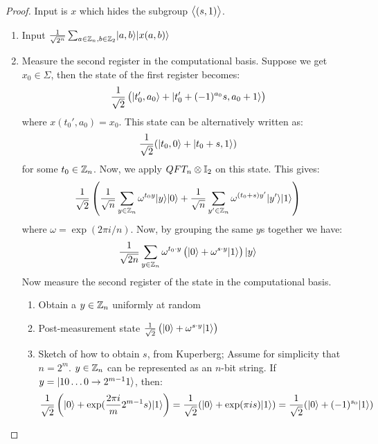 \begin{proof}
    Input is $x$ which hides the subgroup $\left< (s, 1) \right>$.
    \begin{enumerate}
        \item Input $\frac{1}{\sqrt{2^n}}\sum_{a \in \mathbb{Z}_n, b \in \mathbb{Z}_2}\lvert a, b \rangle\lvert x(a, b) \rangle$
        \item Measure the second register in the computational basis. Suppose we get $x_0 \in \Sigma$, then the state of the first register becomes:
        \begin{equation}
            \frac{1}{\sqrt{2}}\left(\lvert t_0', a_0 \rangle + \lvert t_0' + (-1)^{a_0}s, a_0 + 1 \rangle\right)
        \end{equation}
        where $x(t_0', a_0) = x_0$. This state can be alternatively written as:
        \begin{equation}
            \frac{1}{\sqrt{2}}(\lvert t_0, 0 \rangle + \lvert t_0 + s, 1 \rangle)
        \end{equation}
        for some $t_0 \in \mathbb{Z}_n$. Now, we apply $QFT_n \otimes \mathbb{I}_2$ on this state. This gives:
        \begin{equation}
            \frac{1}{\sqrt{2}}\left(\frac{1}{\sqrt{n}}\sum_{y \in \mathbb{Z}_n}\omega^{t_0 y}\lvert y \rangle\lvert 0 \rangle + \frac{1}{\sqrt{n}}\sum_{y' \in \mathbb{Z}_n}\omega^{(t_0 + s)y'}\lvert y' \rangle\lvert 1 \rangle\right)
        \end{equation} 
        where $\omega = \exp(2\pi i/n)$. Now, by grouping the same $y$s together we have:
        \begin{equation}
            \frac{1}{\sqrt{2n}}\sum_{y \in \mathbb{Z}_n}\omega^{t_0 \cdot y}\left(\lvert 0 \rangle + \omega^{s \cdot y}\lvert 1 \rangle\right)\lvert y \rangle
        \end{equation}
        Now measure the second register of the state in the computational basis.
        \begin{enumerate}
            \item Obtain a $y \in \mathbb{Z}_n$ uniformly at random
            \item Post-measurement state $\frac{1}{\sqrt{2}}\left(\lvert 0 \rangle + \omega^{s \cdot y}\lvert 1 \rangle\right)$
            \item Sketch of how to obtain $s$, from Kuperberg; Assume for simplicity that $n = 2^m$. $y \in \mathbb{Z}_n$ can be represented as an $n$-bit string. If $y = \lvert 1 0\ldots 0 \to 2^{m-1} 1 \rangle$, then:
            \begin{equation}
                \frac{1}{\sqrt{2}}\left(\ket{0} + \exp(\frac{2\pi i}{m}2^{m-1}s)\ket{1}\right) = \frac{1}{\sqrt{2}}(\ket{0} + \exp(\pi i s)\ket{1}) = \frac{1}{\sqrt{2}}(\ket{0} + (-1)^{s_0}\ket{1})

\end{equation}
\end{enumerate}
\end{enumerate}
\end{proof}
